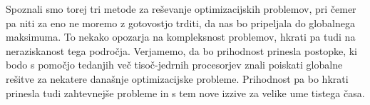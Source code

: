 \documentclass[a4paper]{article}
\begin{document}
Spoznali smo torej tri metode za reševanje optimizacijskih problemov, pri čemer pa niti za eno
ne moremo z gotovostjo trditi, da nas bo pripeljala do globalnega maksimuma. To nekako opozarja
na kompleksnost problemov, hkrati pa tudi na neraziskanost tega področja. Verjamemo, da bo
prihodnost prinesla postopke, ki bodo s pomočjo tedanjih več tisoč-jedrnih procesorjev znali
poiskati globalne rešitve za nekatere današnje optimizacijske probleme. Prihodnost pa bo
hkrati prinesla tudi zahtevnejše probleme in s tem nove izzive za velike ume tistega časa.
\end{document}
